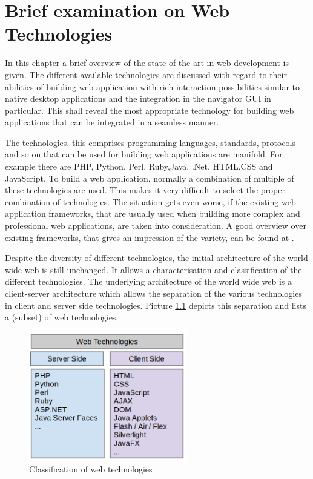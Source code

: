 \chapter{Brief examination on Web Technologies}\label{chap:web_dev}

In this chapter a brief overview of the state of the art in web development is given.
The different available technologies are discussed with regard to their abilities of building web application with rich interaction possibilities similar to native desktop applications and the integration in the navigator GUI in particular.
This shall reveal the most appropriate technology for building web applications that can be integrated in a seamless manner.

The technologies, this comprises programming languages, standards, protocols and so on that can be used for building web applications are manifold.
For example there are PHP, Python, Perl, Ruby,Java, .Net, HTML,CSS and JavaScript.
To build a web application, normally a combination of multiple of these technologies are used.
This makes it very difficult to select the proper combination of technologies.
The situation gets even worse, if the existing web application frameworks, that are usually used when building more complex and professional web applications, are taken into consideration.
A good overview over existing frameworks, that gives an impression of the variety, can be found at \autocite{web-dev:list-frameworks}.

Despite the diversity of different technologies, the initial architecture of the world wide web is still unchanged.
It allows a characterisation and classification of the different technologies.
The underlying architecture of the world wide web is a client-server architecture which allows the separation of the various technologies in client and server side technologies.
Picture \ref{fig:web-technologies} depicts this separation and lists a (subset) of web technologies.

\begin{figure}
	\centering \includegraphics[width=0.61\textwidth]{./img/web-dev/web_technologies.png}
	\caption{Classification of web technologies}
	\label{fig:web-technologies}
\end{figure}


